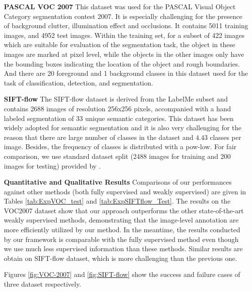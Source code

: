 \textbf{PASCAL VOC 2007}
This dataset was used for the PASCAL Visual Object Category segmentation contest 2007. It is especially challenging for the presence of background clutter, illumination effect and occlusions. It contains 5011 training images, and 4952 test images. Within the training set, for a subset of 422 images which are suitable for evaluation of the segmentation task, the object in these images are marked at pixel level, while the objects in the other images only have the bounding boxes indicating the location of the object and rough boundaries. And there are 20 foreground and 1 background classes in this dataset used for the task of classification, detection, and segmentation.


\textbf{SIFT-flow} The SIFT-flow dataset\cite{liu2011nonparametric} is derived from the LabelMe subset and contains 2688 images of resolution 256x256 pixels, accompanied with a hand labeled segmentation of 33 unique semantic categories. This dataset has been widely adopted for semantic segmentation and it is also very challenging for the reason that there are large number of classes in the dataset and $4.43$ classes per image. Besides, the frequency of classes is distributed with a pow-low. For fair comparison, we use standard dataset split (2488 images for training and 200 images for testing) provided by \cite{liu2011nonparametric}.

\textbf{Quantitative and Qualitative Results} Comparisons of our performances against other methods (both fully supervised and weakly supervised) are given in Tables \ref{tab:ExpVOC_test} and \ref{tab:ExpSIFTflow_Test}. The results on the VOC2007 dataset show that our approach outperforms the other state-of-the-art weakly supervised methods, demonstrating that the image-level annotation are more efficiently utilized by our method. In the meantime, the results conducted by our framework is comparable with the fully supervised method even though we use much less supervised information than these methods. Similar results are obtain on SIFT-flow dataset, which is more challenging than the previous one.

Figures \ref{fig:VOC-2007} and \ref{fig:SIFT-flow} show the success and failure cases of three dataset respectively.

